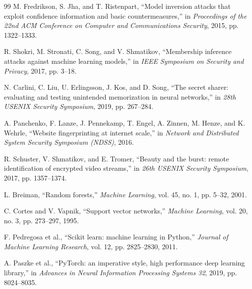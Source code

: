 \documentclass[12pt,a4paper]{article}
\begin{document}
\begin{thebibliography}{99}
M. Fredrikson, S. Jha, and T. Ristenpart,
``Model inversion attacks that exploit confidence information and basic countermeasures,''
in \textit{Proceedings of the 22nd ACM Conference on Computer and Communications Security}, 2015, pp. 1322--1333.

R. Shokri, M. Stronati, C. Song, and V. Shmatikov,
``Membership inference attacks against machine learning models,''
in \textit{IEEE Symposium on Security and Privacy}, 2017, pp. 3--18.

N. Carlini, C. Liu, U. Erlingsson, J. Kos, and D. Song,
``The secret sharer: evaluating and testing unintended memorization in neural networks,''
in \textit{28th USENIX Security Symposium}, 2019, pp. 267--284.

A. Panchenko, F. Lanze, J. Pennekamp, T. Engel, A. Zinnen, M. Henze, and K. Wehrle,
``Website fingerprinting at internet scale,''
in \textit{Network and Distributed System Security Symposium (NDSS)}, 2016.

R. Schuster, V. Shmatikov, and E. Tromer,
``Beauty and the burst: remote identification of encrypted video streams,''
in \textit{26th USENIX Security Symposium}, 2017, pp. 1357--1374.

L. Breiman,
``Random forests,''
\textit{Machine Learning}, vol. 45, no. 1, pp. 5--32, 2001.

C. Cortes and V. Vapnik,
``Support vector networks,''
\textit{Machine Learning}, vol. 20, no. 3, pp. 273--297, 1995.

F. Pedregosa et al.,
``Scikit learn: machine learning in Python,''
\textit{Journal of Machine Learning Research}, vol. 12, pp. 2825--2830, 2011.

A. Paszke et al.,
``PyTorch: an imperative style, high performance deep learning library,''
in \textit{Advances in Neural Information Processing Systems 32}, 2019, pp. 8024--8035.

\end{thebibliography}
\end{document}
